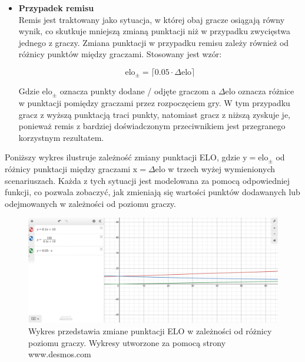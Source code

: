 \documentclass[twoside]{projektInzynierskiMS1}
\begin{document}
\begin{itemize}
\newpage

    \item \textbf{Przypadek remisu}\\
    Remis jest traktowany jako sytuacja, w której obaj gracze osiągają równy wynik, co skutkuje mniejszą zmianą punktacji niż w przypadku zwycięstwa jednego z graczy. Zmiana punktacji w przypadku remisu zależy również od różnicy punktów między graczami. Stosowany jest wzór:

    \[ \text{elo}_{\pm} = \lceil 0.05 \cdot \Delta \text{elo} \rceil \]

    Gdzie $ \text{elo}_{\pm} $ oznacza punkty dodane / odjęte graczom a $ \Delta \text{elo} $ oznacza różnice w punktacji pomiędzy graczami przez rozpoczęciem gry.     W tym przypadku gracz z wyższą punktacją traci punkty, natomiast gracz z niższą zyskuje je, ponieważ remis z bardziej doświadczonym przeciwnikiem jest przegranego korzystnym rezultatem.

\end{itemize}

\noindent
Poniższy wykres ilustruje zależność zmiany punktacji ELO, gdzie $ \text{y} = \text{elo}_{\pm} $ od różnicy punktacji między graczami $ \text{x} = \Delta \text{elo} $  w trzech wyżej wymienionych scenariuszach. Każda z tych sytuacji jest modelowana za pomocą odpowiedniej funkcji, co pozwala zobaczyć, jak zmieniają się wartości punktów dodawanych lub odejmowanych w zależności od poziomu graczy.

\vspace{0.5cm}
\begin{figure}[h!]
    \centering
    \includegraphics[width=1\textwidth]{images/graf_elo_calc.png}
    \caption{Wykres przedstawia zmiane punktacji ELO w zależności od różnicy poziomu graczy. Wykresy utworzone za pomocą strony www.desmos.com}
\end{figure}
\vspace{0.5cm}

\newpage
\end{document}
